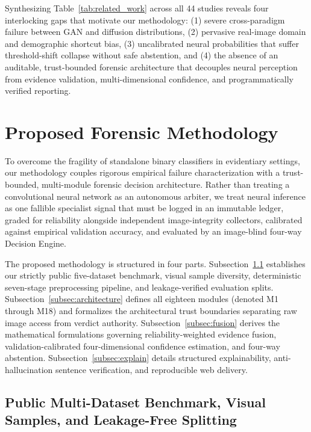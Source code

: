 \documentclass[final,5p,times,twocolumn,numafflabel]{elsarticle}
\begin{document}
Synthesizing Table~\ref{tab:related_work} across all 44 studies reveals four interlocking gaps that motivate our methodology: (1) severe cross-paradigm failure between GAN and diffusion distributions, (2) pervasive real-image domain and demographic shortcut bias, (3) uncalibrated neural probabilities that suffer threshold-shift collapse without safe abstention, and (4) the absence of an auditable, trust-bounded forensic architecture that decouples neural perception from evidence validation, multi-dimensional confidence, and programmatically verified reporting.

\section{Proposed Forensic Methodology}
\label{sec:method}

To overcome the fragility of standalone binary classifiers in evidentiary settings, our methodology couples rigorous empirical failure characterization with a trust-bounded, multi-module forensic decision architecture. Rather than treating a convolutional neural network as an autonomous arbiter, we treat neural inference as one fallible specialist signal that must be logged in an immutable ledger, graded for reliability alongside independent image-integrity collectors, calibrated against empirical validation accuracy, and evaluated by an image-blind four-way Decision Engine.

The proposed methodology is structured in four parts. Subsection~\ref{subsec:benchmark} establishes our strictly public five-dataset benchmark, visual sample diversity, deterministic seven-stage preprocessing pipeline, and leakage-verified evaluation splits. Subsection~\ref{subsec:architecture} defines all eighteen modules (denoted M1 through M18) and formalizes the architectural trust boundaries separating raw image access from verdict authority. Subsection~\ref{subsec:fusion} derives the mathematical formulations governing reliability-weighted evidence fusion, validation-calibrated four-dimensional confidence estimation, and four-way abstention. Subsection~\ref{subsec:explain} details structured explainability, anti-hallucination sentence verification, and reproducible web delivery.

\subsection{Public Multi-Dataset Benchmark, Visual Samples, and Leakage-Free Splitting}
\label{subsec:benchmark}
\end{document}
